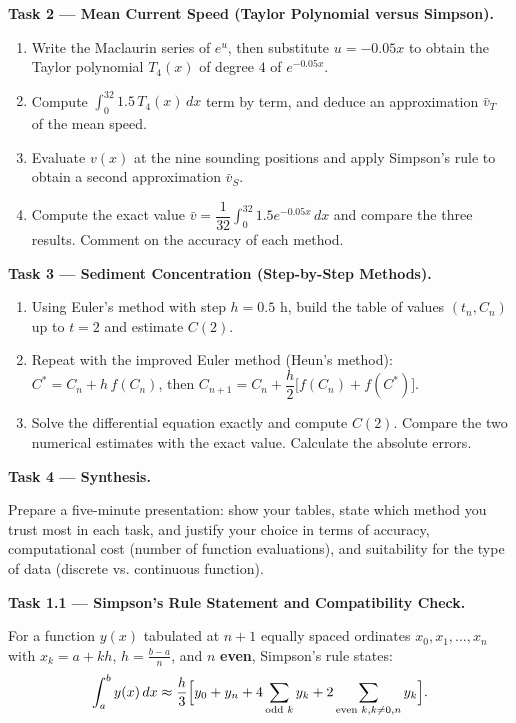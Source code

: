 \documentclass[11pt]{article}
\newcounter{popsec}
\newcounter{popsub}
\newcommand{\courssub}[1]{%
  \stepcounter{popsub}%
  \par\vspace{9pt}\noindent{\popxbold\fontsize{11.5}{13}\selectfont\color{popink}{\color{poporange}\thepopsec.\thepopsub}\hspace{6pt}#1}\par\nopagebreak\vspace{4pt}
}
\begin{document}
\textbf{Task 2 — Mean Current Speed (Taylor Polynomial versus Simpson).}
\begin{enumerate}
\item Write the Maclaurin series of $e^{u}$, then substitute $u=-0.05x$ to obtain the Taylor polynomial $T_{4}(x)$ of degree $4$ of $e^{-0.05x}$.
\item Compute $\displaystyle\int_{0}^{32}1.5\,T_{4}(x)\,dx$ term by term, and deduce an approximation $\bar v_{T}$ of the mean speed.
\item Evaluate $v(x)$ at the nine sounding positions and apply Simpson's rule to obtain a second approximation $\bar v_{S}$.
\item Compute the exact value $\bar v=\dfrac{1}{32}\displaystyle\int_{0}^{32}1.5e^{-0.05x}\,dx$ and compare the three results. Comment on the accuracy of each method.
\end{enumerate}

\textbf{Task 3 — Sediment Concentration (Step-by-Step Methods).}
\begin{enumerate}
\item Using Euler's method with step $h=0.5$ h, build the table of values $(t_n, C_n)$ up to $t=2$ and estimate $C(2)$.
\item Repeat with the improved Euler method (Heun's method):
      $C^{*}=C_n+h\,f(C_n)$, then $C_{n+1}=C_n+\dfrac{h}{2}\bigl[f(C_n)+f(C^{*})\bigr]$.
\item Solve the differential equation exactly and compute $C(2)$. Compare the two numerical estimates with the exact value. Calculate the absolute errors.
\end{enumerate}

\textbf{Task 4 — Synthesis.}\par
Prepare a five-minute presentation: show your tables, state which method you trust most in each task, and justify your choice in terms of accuracy, computational cost (number of function evaluations), and suitability for the type of data (discrete vs. continuous function).

\courssub{Model Answer}

\textbf{Task 1.1 — Simpson's Rule Statement and Compatibility Check.}\par
For a function $y(x)$ tabulated at $n+1$ equally spaced ordinates $x_0, x_1, \dots, x_n$ with $x_k = a + kh$, $h = \frac{b-a}{n}$, and $n$ \textbf{even}, Simpson's rule states:
\[ \int_{a}^{b} y(x)\,dx \approx \frac{h}{3}\Bigl[ y_0 + y_n + 4\sum_{\text{odd } k} y_k + 2\sum_{\text{even } k, k\neq 0,n} y_k \Bigr]. \]
\end{document}
